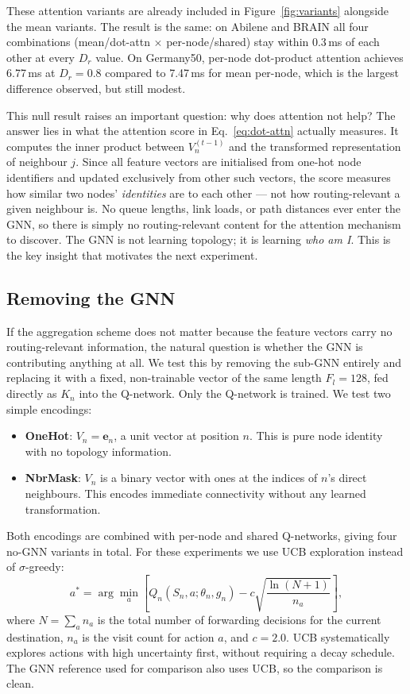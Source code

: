 \documentclass[10pt,twocolumn,letterpaper]{article}
\begin{document}
These attention variants are already included in Figure~\ref{fig:variants} alongside the mean variants. The result is the same: on Abilene and BRAIN all four combinations (mean/dot-attn $\times$ per-node/shared) stay within 0.3\,ms of each other at every $D_r$ value. On Germany50, per-node dot-product attention achieves 6.77\,ms at $D_r = 0.8$ compared to 7.47\,ms for mean per-node, which is the largest difference observed, but still modest.

This null result raises an important question: why does attention not help? The answer lies in what the attention score in Eq.~\eqref{eq:dot-attn} actually measures. It computes the inner product between $V_n^{(t-1)}$ and the transformed representation of neighbour $j$. Since all feature vectors are initialised from one-hot node identifiers and updated exclusively from other such vectors, the score measures how similar two nodes' \emph{identities} are to each other --- not how routing-relevant a given neighbour is. No queue lengths, link loads, or path distances ever enter the GNN, so there is simply no routing-relevant content for the attention mechanism to discover. The GNN is not learning topology; it is learning \emph{who am I}. This is the key insight that motivates the next experiment.

\subsection{Removing the GNN}
\label{sec:nognn}

If the aggregation scheme does not matter because the feature vectors carry no routing-relevant information, the natural question is whether the GNN is contributing anything at all. We test this by removing the sub-GNN entirely and replacing it with a fixed, non-trainable vector of the same length $F_l = 128$, fed directly as $K_n$ into the Q-network. Only the Q-network is trained. We test two simple encodings:

\begin{itemize}
    \item \textbf{OneHot}: $V_n = \mathbf{e}_n$, a unit vector at position $n$. This is pure node identity with no topology information.
    \item \textbf{NbrMask}: $V_n$ is a binary vector with ones at the indices of $n$'s direct neighbours. This encodes immediate connectivity without any learned transformation.
\end{itemize}

Both encodings are combined with per-node and shared Q-networks, giving four no-GNN variants in total. For these experiments we use UCB exploration instead of $\sigma$-greedy:
\begin{equation}
  a^* = \arg\min_a \!\left[
    Q_n(S_n, a;\theta_n, g_n) - c\sqrt{\frac{\ln(N+1)}{n_a}}
  \right],
  \label{eq:ucb}
\end{equation}
where $N = \sum_a n_a$ is the total number of forwarding decisions for the current destination, $n_a$ is the visit count for action $a$, and $c = 2.0$. UCB systematically explores actions with high uncertainty first, without requiring a decay schedule. The GNN reference used for comparison also uses UCB, so the comparison is clean.
\end{document}

